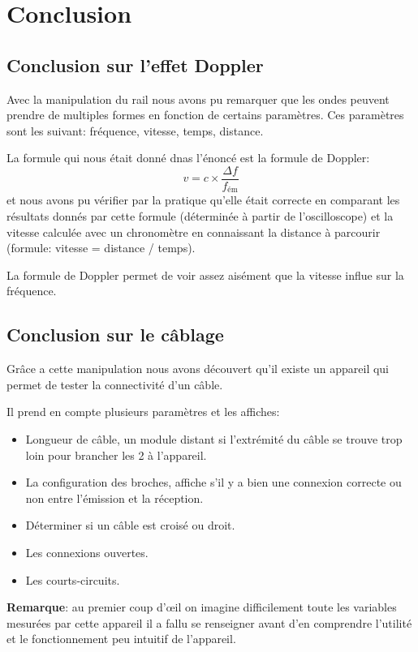 \documentclass[a4paper]{article}
\begin{document}
\section{Conclusion}










\subsection{Conclusion sur l'effet Doppler}





Avec la manipulation du rail nous avons pu remarquer que les ondes peuvent prendre de multiples formes en fonction de certains paramètres. Ces paramètres sont les suivant: fréquence, vitesse, temps, distance.

La formule qui nous était donné dnas l'énoncé est la formule de Doppler:
\[ v = c \times \frac{\Delta f}{f_\text{ém}} \]
et nous avons pu vérifier par la pratique qu'elle était correcte en comparant les résultats donnés par cette formule (déterminée à partir de l’oscilloscope) et la vitesse calculée avec un chronomètre en connaissant la distance à parcourir (formule: vitesse = distance / temps).

La formule de Doppler permet de voir assez aisément que la vitesse influe sur la fréquence.










\subsection{Conclusion sur le câblage}





Grâce a cette manipulation nous avons découvert qu’il existe un appareil qui permet de tester la connectivité d’un câble. 

Il prend en compte plusieurs paramètres et les affiches:
\begin{itemize}
  \item Longueur de câble, un module distant si l’extrémité du câble se trouve trop loin pour brancher les 2 à l’appareil.
  \item La configuration des broches, affiche s’il y a bien une connexion correcte ou non entre l’émission et la réception.
  \item Déterminer si un câble est croisé ou droit.
  \item Les connexions ouvertes.
  \item Les courts-circuits.
\end{itemize}

\textbf{Remarque}: au premier coup d’œil on imagine difficilement toute les variables mesurées par cette appareil il a fallu se renseigner avant d’en comprendre l’utilité et le fonctionnement peu intuitif de l'appareil.
\end{document}
